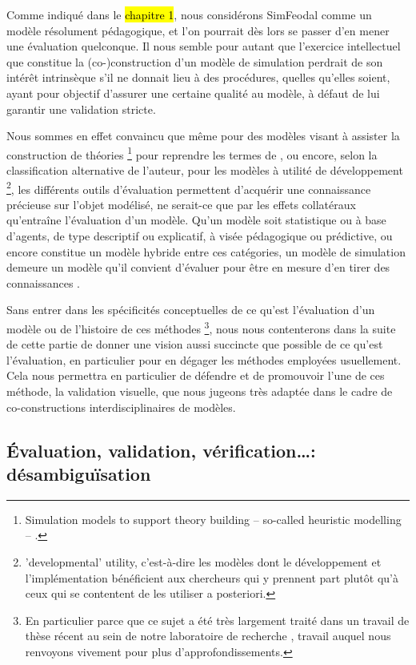 Comme indiqué dans le \hl{chapitre 1}, nous considérons SimFeodal comme un modèle résolument pédagogique, et l'on pourrait dès lors se passer d'en mener une évaluation quelconque.
Il nous semble pour autant que l'exercice intellectuel que constitue la (co-)construction d'un modèle de simulation perdrait de son intérêt intrinsèque s'il ne donnait lieu à des procédures, quelles qu'elles soient, ayant pour objectif d'assurer une certaine qualité au modèle, à défaut de lui garantir une validation stricte.

Nous sommes en effet convaincu que même pour des modèles visant à \og assister la construction de théories\fg{}
\footnote{
	\og Simulation models to support theory building -- so-called heuristic modelling -- \textelp{}.\fg{}
} pour reprendre les termes de \textcite[260]{lake_trends_2014}, ou encore, selon la classification alternative de l'auteur, pour les modèles à utilité \og de développement\fg{}
\footnote{
	\og 'developmental' utility\fg{}, c'est-à-dire les modèles dont le développement et l'implémentation bénéficient aux chercheurs qui y prennent part plutôt qu'à ceux qui se contentent de les utiliser a posteriori.
}, les différents outils d'évaluation permettent d'acquérir une connaissance précieuse sur l'objet modélisé, ne serait-ce que par les effets collatéraux qu'entraîne l'évaluation d'un modèle.
Qu'un modèle soit statistique ou à base d'agents, de type descriptif ou explicatif, à visée pédagogique ou prédictive, ou encore constitue un modèle \og hybride\fg{} entre ces catégories, un modèle de simulation demeure un modèle qu'il convient d'évaluer pour être en mesure d'en tirer des connaissances \autocite[299-300]{sargent_history_2017}.

Sans entrer dans les spécificités conceptuelles de ce qu'est l'évaluation d'un modèle ou de l'histoire de ces méthodes
\footnote{
	En particulier parce que ce sujet a été très largement traité dans un travail de thèse récent au sein de notre laboratoire de recherche \autocite[pp. 58--184]{rey-coyrehourcq_plateforme_2015}, travail auquel nous renvoyons vivement pour plus d'approfondissements.
}, nous nous contenterons dans la suite de cette partie de donner une vision aussi succincte que possible de ce qu'est l'évaluation, en particulier pour en dégager les méthodes employées usuellement.
Cela nous permettra en particulier de défendre et de promouvoir l'une de ces méthode, la validation visuelle, que nous jugeons très adaptée dans le cadre de co-constructions interdisciplinaires de modèles.

\subsection{Évaluation, validation, vérification\ldots : désambiguïsation}

